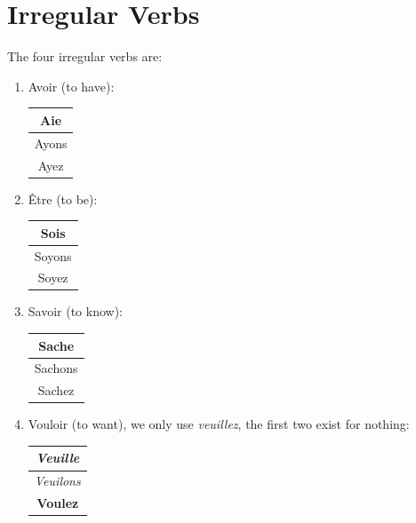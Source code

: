 \documentclass{book}
\begin{document}
\section{Irregular Verbs}
The four irregular verbs are:
\begin{enumerate}
    \item Avoir (to have):
    \begin{center}
        \begin{tabular}{|c|}
            \hline
            Aie \\
            \hline
            Ayons \\
            \hline
            Ayez \\
            \hline
        \end{tabular}
    \end{center}

    \item Être (to be):
    \begin{center}
        \begin{tabular}{|c|}
            \hline
            Sois \\
            \hline
            Soyons \\
            \hline
            Soyez \\
            \hline
        \end{tabular}
    \end{center}

    \item Savoir (to know):
    \begin{center}
        \begin{tabular}{|c|}
            \hline
            Sache \\
            \hline
            Sachons \\
            \hline
            Sachez \\
            \hline
        \end{tabular}
    \end{center}

    \item Vouloir (to want), we only use \textit{veuillez}, the first two exist for nothing:
    \begin{center}
        \begin{tabular}{|c|}
            \hline
            \textit{Veuille} \\
            \hline
            \textit{Veuilons} \\
            \hline
            \textbf{Voulez} \\
            \hline
        \end{tabular}
    \end{center}
\end{enumerate}
\end{document}
